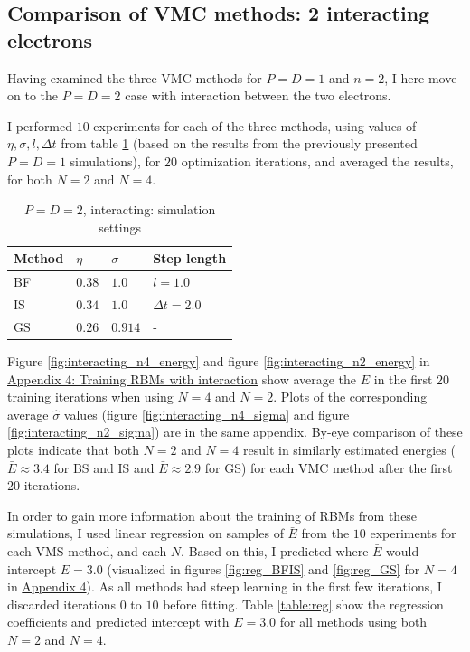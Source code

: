 \documentclass[%
oneside,                 %
final,                   %
10pt]{article}
\begin{document}
\subsection{Comparison of VMC methods: 2 interacting electrons}
Having examined the three VMC methods for $P=D=1$ and $n=2$, I here move on to the $P=D=2$ case with interaction between the two electrons. 

I performed $10$ experiments for each of the three methods, using values of $\eta, \sigma, l, \Delta t$ from table \ref{table:sim_set} (based on the results from the previously presented $P=D=1$ simulations), for $20$ optimization iterations, and averaged the results, for both $N=2$ and $N=4$. 
\begin{table}[H]
\begin{center}
\begin{tabular}{llll}
\hline
Method & $\eta$ & $\sigma$ & Step length \\
\hline
BF &  $ 0.38 $  & $ 1.0$ & $l=1.0$  \\
IS &  $ 0.34 $  &$1.0 $  & $\Delta t=2.0$\\
GS &  $ 0.26 $ &$0.914 $ & -  \\
\hline
\end{tabular}
\end{center}
\caption{$P=D=2$, interacting: simulation settings}
\label{table:sim_set}
\end{table}


Figure  \ref{fig:interacting_n4_energy} and figure \ref{fig:interacting_n2_energy} in \hyperref[APP_4]{Appendix 4: Training RBMs with interaction} show average the $\bar E$ in the first $20$ training iterations when using $N=4$ and $N=2$. Plots of the corresponding average $\hat \sigma$ values (figure \ref{fig:interacting_n4_sigma} and figure \ref{fig:interacting_n2_sigma}) are in the same appendix. By-eye comparison of these plots indicate that both $N=2$ and $N=4$ result in similarly estimated energies ($\bar E \approx 3.4$ for BS and IS and $\bar E \approx 2.9$ for GS) for each VMC method after the first $20$ iterations.

In order to gain more information about the training of RBMs from these simulations, I used linear regression on samples of $\bar E$ from the $10$ experiments for each VMS method, and each $N$. Based on this, I predicted where $\bar E$ would intercept $ E=3.0$ (visualized in figures \ref{fig:reg_BFIS} and \ref{fig:reg_GS} for $N=4$ in \hyperref[APP_4]{Appendix 4}).  As all methods had steep learning in the first few iterations, I discarded iterations $0$ to $10$ before fitting. Table \ref{table:reg} show the regression coefficients and predicted intercept with $E=3.0$ for all methods using both $N=2$ and $N=4$.
\end{document}
